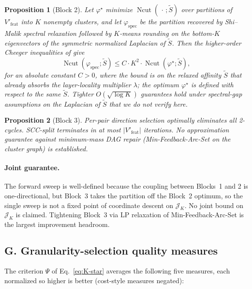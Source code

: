 \documentclass[table, 11pt]{article}
\newtheorem{proposition}{Proposition}
\DeclareMathOperator{\Ncut}{Ncut}
\begin{document}
\begin{proposition}[Block 2]\label{prop:block2}
Let $\varphi^\star$ minimize $\Ncut(\,\cdot\,; \tilde S)$ over
partitions of $V'_{\text{feat}}$ into $K$ nonempty clusters, and let
$\varphi_{\text{spec}}$ be the partition recovered by Shi--Malik
spectral relaxation followed by $K$-means rounding on the bottom-$K$
eigenvectors of the symmetric normalized Laplacian of $\tilde S$.
Then the higher-order Cheeger inequalities of
\cite{lee2014multiway, louis2012many} give
\begin{equation}
\Ncut(\varphi_{\text{spec}}; \tilde S)
\le C \cdot K^2 \cdot \Ncut(\varphi^\star; \tilde S),
\end{equation}
for an absolute constant $C > 0$, where the bound is on the relaxed
affinity $\tilde S$ that already absorbs the layer-locality
multiplier $\lambda$; the optimum $\varphi^\star$ is defined with
respect to the same $\tilde S$. Tighter $O(\sqrt{\log K})$
guarantees hold under spectral-gap assumptions on the Laplacian of
$\tilde S$ that we do not verify here.
\end{proposition}

\begin{proposition}[Block 3]\label{prop:block3}
Per-pair direction selection optimally eliminates all 2-cycles.
SCC-split terminates in at most $|V'_{\text{feat}}|$ iterations. No
approximation guarantee against minimum-mass DAG repair
(Min-Feedback-Arc-Set on the cluster graph) is established.
\end{proposition}

\paragraph{Joint guarantee.}
The forward sweep is well-defined because the coupling between
Blocks~1 and 2 is one-directional, but Block~3 takes the partition
off the Block~2 optimum, so the single sweep is not a fixed point
of coordinate descent on $\mathcal{J}_K$. No joint bound on
$\mathcal{J}_K$ is claimed. Tightening Block~3 via LP relaxation of
Min-Feedback-Arc-Set is the largest improvement headroom.

\subsection*{G. Granularity-selection quality measures}\label{app:k-selection}

The criterion $\Psi$ of Eq.~\eqref{eq:K-star} averages the following
five measures, each normalized so higher is better (cost-style
measures negated):
\end{document}

